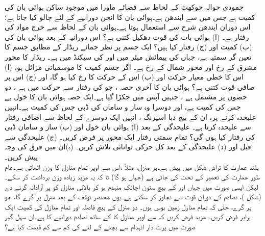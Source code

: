 جمودی حوالہ چوکھٹ کے لحاظ سے   فضائے ماورا میں موجود  ساکن ہوائی بان کی کمیت  ہے جس میں سے  ایندھن ہے۔ہوائی بان کا انجن  دورانیے  کے لئے چالو کیا جاتا ہے؛اس دوران ایندھن  شرح سے  استعمال ہوتا ہے۔ہوائی بان کے لحاظ سے خرج مواد کی رفتار  ہے۔ (ا)  ہوائی بات کی قوت دھکیل کتنی ہے؟  اس دورانیہ کے بعد ہوائی بان کی (ب) کمیت اور (ج) رفتار کیا ہیں؟
ایک جسم  پر نظر جمائے ریڈار کے مطابق جسم کا تعین گر  سمتیہ  ہے، جہاں  کی پیمائش میٹر میں اور  کی سیکنڈ میں ہے۔ ریڈار  کا  محور مشرق کے   رخ  اور  محور شمال   کے رخ ہے۔ اگر  جسم    کمیت کا موسمیاتی  مزائل ہو، (ا) اس کا خطی معیار حرکت اور (ب) اس کے حرکت کا  رخ کیا ہو گا، اور (ج)  اس پر صافی قوت کتنی ہے؟
ہوائی بان کا آخری  حصہ ، جو    کی رفتار سے حرکت میں ہے ، دو حصوں پر مشتمل ہے ، جنہیں  آپس میں جکڑا گیا ہے۔ایک حصہ  ہوائی بان کا  خول   ہے جس کی کمیت  ہے، اور دوسرا  وہ ساز و سامان کی    ڈبی   جس  کی کمیت  ہے۔انہیں علیحدہ کرنے پر، ان کے بیچ دبا اسپرنگ ، انہیں ایک دوسرے کے لحاظ سے اضافی رفتار سے   علیحدہ کرتا ہے۔ علیحدگی کے بعد  (ا) ہوائی بان خول اور (ب) ساز و   سامان  ڈبی کی رفتار کیا ہوں گی؟ تمام سمتی رفتار ایک محور پر  فرض کریں۔ (ج) علیحدگی سے قبل اور (د)  علیحدگی کے بعد  کل حرکی توانائی تلاش کریں۔ (ہ)ان میں    فرق کی وجہ پیش کریں۔
\\
بلند عمارت کا تراش شکل  میں پیش ہے۔ہر منزل، مثلاً  ،اس سے اوپر   تمام منازل کا وزن  اٹھاتی ہے۔عام طور عمارت    کی تعمیر    کے تحت کی  جاتی ہے (جہاں  ہو گا)  تا کہ یہ مزید زیادہ وزن  برداشت کر سکے۔لیکن ایسی صورت میں جہاں  اور  کے بیچ  ستون اچانک منہدم ہو کر بالائی منازل کو پر  آزادانہ  گرنے دے (شکل )،  تصادم کے دوران  قوت   سے تجاوز کر سکتی ہے۔یوں  مختصر توقف کے بعد  منزل  پر گرے گا، جو  پر گرے، حتٰی کہ تمام منازل زمین بوس  ہوں۔  دو منزل کے  بیچ فاصلہ   اور تمام منازل کی کمیت ایک برابر  فرض کریں۔ مزید  فرض کریں کہ  سے اوپر منازل کا  کے ساتھ تصادم  دورانیے کا ہے۔ان  سہل گیر  صورت   میں پرت دار انہدام سے بچنے کے لئے  کی کم سے کم قیمت کیا ہے؟

